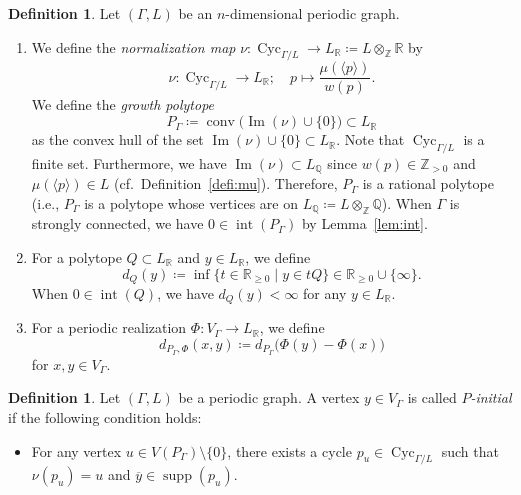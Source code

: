 \documentclass[10pt,a4paper]{amsart}
\theoremstyle{plain}
\theoremstyle{definition}
\newtheorem{defi}[cdrthm]{Definition}
\theoremstyle{remark}
\begin{document}
\setcounter{cdrthm}{18}
\begin{defi}\label{defi:P}
Let $(\Gamma , L)$ be an $n$-dimensional periodic graph. 
\begin{enumerate}
\item 
We define the \textit{normalization map} 
$\nu : \operatorname{Cyc}_{\Gamma /L} \to L_{\mathbb{R}} \coloneqq  L \otimes _{\mathbb{Z}} \mathbb{R}$ by 
\[
\nu: \operatorname{Cyc}_{\Gamma /L} \to L_{\mathbb{R}}; \quad p \mapsto \frac{\mu(\langle p \rangle )}{w(p)}. 
\]
We define the \textit{growth polytope}
\[
P_{\Gamma} \coloneqq  \operatorname{conv} \bigl( \operatorname{Im}(\nu) \cup \{ 0 \} \bigr) \subset L_{\mathbb{R}}
\]
as the convex hull of the set 
$\operatorname{Im}(\nu) \cup \{ 0 \} \subset L_{\mathbb{R}}$. 
Note that $\operatorname{Cyc}_{\Gamma /L}$ is a finite set. 
Furthermore, we have $\operatorname{Im}(\nu) \subset L_{\mathbb{Q}}$ since $w(p) \in \mathbb{Z}_{>0}$ and $\mu(\langle p \rangle ) \in L$ (cf.\ Definition~\ref{defi:mu}). 
Therefore, $P_{\Gamma}$ is a rational polytope 
(i.e., $P_{\Gamma}$ is a polytope whose vertices are on $L_{\mathbb{Q}} \coloneqq  L \otimes _{\mathbb{Z}} \mathbb{Q}$). 
When $\Gamma$ is strongly connected, we have $0 \in \operatorname{int}(P_{\Gamma})$ by Lemma~\ref{lem:int}. 
 
\item 
For a polytope $Q \subset L_{\mathbb{R}}$ and $y \in L_{\mathbb{R}}$, we define 
\[
d_{Q}(y) \coloneqq  \inf \{ t \in \mathbb{R}_{\ge 0} \mid y \in t Q \} \in \mathbb{R}_{\ge 0} \cup \{ \infty \}. 
\]
When $0 \in \operatorname{int}(Q)$, 
we have $d_{Q}(y) < \infty$ for any $y \in L_{\mathbb{R}}$. 

\item
For a periodic realization $\Phi\colon V_{\Gamma} \to L_{\mathbb{R}}$, we define 
\[
d_{P_{\Gamma}, \Phi}(x, y) \coloneqq  d_{P_{\Gamma}}\bigl( \Phi(y) - \Phi(x) \bigr)
\]
for $x, y \in V_{\Gamma}$. 
\end{enumerate}
\end{defi}

\setcounter{cdrthm}{20}
\begin{defi}
Let $(\Gamma , L)$ be a periodic graph. 
A vertex $y \in V_{\Gamma}$ is called \textit{$P$-initial} if the following condition holds: 
\begin{itemize}
\item For any vertex $u \in V(P_{\Gamma})\setminus \{ 0 \}$, 
there exists a cycle $p_u \in \operatorname{Cyc}_{\Gamma /L}$ such that 
$\nu (p_u) = u$ and $\overline{y} \in \operatorname{supp}(p_u)$. 
\end{itemize}
\end{defi}
\end{document}

